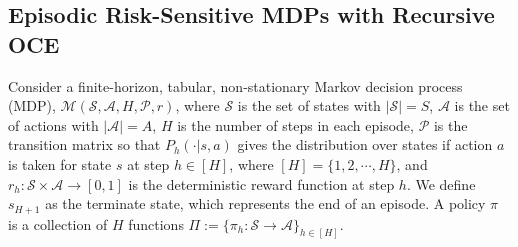 \documentclass[11pt]{article}
\newcommand{\1}{\mathbbm{1}}
\begin{document}



\subsection{Episodic Risk-Sensitive MDPs with Recursive OCE}
\label{sec:epis}
Consider a finite-horizon, tabular, non-stationary Markov decision process (MDP), $\mathcal{M}(\mathcal{S},\mathcal{A},H,\mathcal{P},r)$, where $\mathcal{S}$ is the set of states with $\vert \mathcal{S}\vert=S$, $\mathcal{A}$ is the set of actions with $\vert \mathcal{A}\vert=A$, $H$ is the number of steps in each episode, $\mathcal{P}$ is the transition matrix so that $P_h(\cdot\vert s,a)$ gives the distribution over states if action $a$ is taken for state $s$ at step $h\in [H]$, where $[H]=\{1,2,\cdots,H\}$, and $r_h:\mathcal{S}\times \mathcal{A}\rightarrow [0,1]$ is the deterministic reward function at step $h$. We define $s_{H+1}$ as the terminate state, which represents the end of an episode. A policy $\pi$ is a collection of $H$ functions $\mathcal{\varPi}:=\{\pi_h:\mathcal{S} \to \mathcal{A}\}_{h\in [H]}$. 
\end{document}
